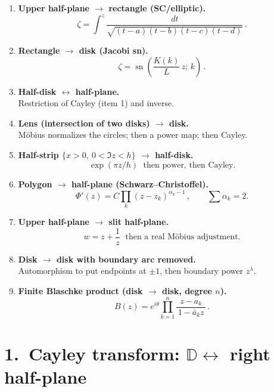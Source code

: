\documentclass[11pt]{article}
\begin{document}
\begin{enumerate}
	\item \textbf{Upper half-plane $\to$ rectangle (SC/elliptic).}\\[2pt]
	\[
	\boxed{\,\zeta=\int^z \frac{dt}{\sqrt{(t-a)(t-b)(t-c)(t-d)}}\,}.
	\]
	
	\item \textbf{Rectangle $\to$ disk (Jacobi sn).}\\[2pt]
	\[
	\boxed{\,\zeta=\operatorname{sn}\!\left(\frac{K(k)}{L}\,z;\,k\right)\,}.
	\]
	
	\item \textbf{Half-disk $\leftrightarrow$ half-plane.}\\[2pt]
	Restriction of Cayley (item 1) and inverse.
	
	\item \textbf{Lens (intersection of two disks) $\to$ disk.}\\[2pt]
	Möbius normalizes the circles; then a power map; then Cayley.
	
	\item \textbf{Half-strip $\{x>0,\ 0<\Im z<h\}$ $\to$ half-disk.}\\[2pt]
	\[
	\boxed{\,\exp(\pi z/h)\,}\ \ \text{then power, then Cayley}.
	\]
	
	\item \textbf{Polygon $\to$ half-plane (Schwarz--Christoffel).}\\[2pt]
	\[
	\boxed{\,\Phi'(z)=C\prod_k (z-z_k)^{\alpha_k-1}\,},\qquad \sum\alpha_k=2.
	\]
	
	\item \textbf{Upper half-plane $\to$ slit half-plane.}\\[2pt]
	\[
	\boxed{\,w=z+\frac{1}{z}\,}\ \ \text{then a real Möbius adjustment}.
	\]
	
	\item \textbf{Disk $\to$ disk with boundary arc removed.}\\[2pt]
	Automorphism to put endpoints at $\pm1$, then boundary power $z^\lambda$.
	
	\item \textbf{Finite Blaschke product (disk $\to$ disk, degree $n$).}\\[2pt]
	\[
	\boxed{\,B(z)=e^{i\theta}\prod_{k=1}^n \frac{z-a_k}{\,1-\bar a_k z\,}\,}.
	\]
\end{enumerate}

	
	
	
\section*{1.\ Cayley transform: $\mathbb D \leftrightarrow$ right half-plane}
\end{document}
